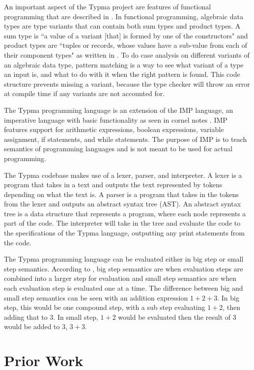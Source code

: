 \documentclass[10pt,twocolumn]{article}
\begin{document}
An important aspect of the Typma project are features of functional programming that are described in \textcite{OCaml}. In functional programming, algebraic data types are type variants that can contain both sum types and product types. A sum type is ``a value of a variant [that] is formed by one of the constructors" and product types are ``tuples or records, whose values have a sub-value from each of their component types" as written in \textcite{OCaml}. To do case analysis on different variants of an algebraic data type, pattern matching is a way to see what variant of a type an input is, and what to do with it when the right pattern is found. This code structure prevents missing a variant, because the type checker will throw an error at compile time if any variants are not accounted for.

The Typma programming language is an extension of the IMP language, an imperative language with basic functionality as seen in cornel notes \textcite{CS4110IMP}. IMP features support for arithmetic expressions, boolean expressions, variable assignment, if statements, and while statements. The purpose of IMP is to teach semantics of programming languages and is not meant to be used for actual programming.

The Typma codebase makes use of a lexer, parser, and interpreter. A lexer is a program that takes in a text and outputs the text represented by tokens depending on what the text is. A parser is a program that takes in the tokens from the lexer and outputs an abstract syntax tree (AST). An abstract syntax tree is a data structure that represents a program, where each node represents a part of the code. The interpreter will take in the tree and evaluate the code to the specifications of the Typma language, outputting any print statements from the code.

The Typma programming language can be evaluated either in big step or small step semantics. According to \textcite{CS4110IMP}, big step semantics are when evaluation steps are combined into a larger step for evaluation and small step semantics are when each evaluation step is evaluated one at a time. The difference between big and small step semantics can be seen with an addition expression $1 + 2 + 3$. In big step, this would be one compound step, with a sub step evaluating $1+ 2$, then adding that to $3$. In small step, $1 + 2$ would be evaluated then the result of $3$ would be added to $3$, $3 + 3$.

\section{Prior Work}
\end{document}

